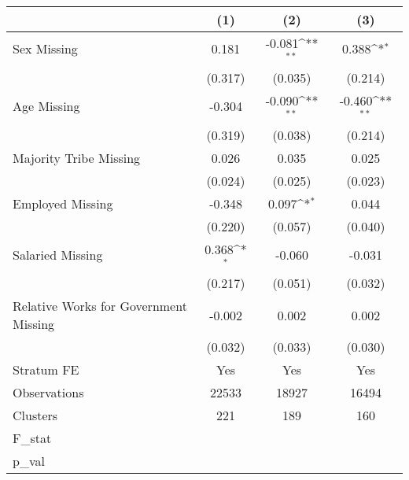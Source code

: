 {
\def\sym#1{\ifmmode^{#1}\else\(^{#1}\)\fi}
\begin{tabular}{l*{3}{c}}
\hline\hline
                &\multicolumn{1}{c}{(1)}         &\multicolumn{1}{c}{(2)}         &\multicolumn{1}{c}{(3)}         \\
\hline
Sex Missing     &    0.181         &   -0.081\sym{**} &    0.388\sym{*}  \\
                &  (0.317)         &  (0.035)         &  (0.214)         \\
Age Missing     &   -0.304         &   -0.090\sym{**} &   -0.460\sym{**} \\
                &  (0.319)         &  (0.038)         &  (0.214)         \\
Majority Tribe Missing&    0.026         &    0.035         &    0.025         \\
                &  (0.024)         &  (0.025)         &  (0.023)         \\
Employed Missing&   -0.348         &    0.097\sym{*}  &    0.044         \\
                &  (0.220)         &  (0.057)         &  (0.040)         \\
Salaried Missing&    0.368\sym{*}  &   -0.060         &   -0.031         \\
                &  (0.217)         &  (0.051)         &  (0.032)         \\
Relative Works for Government Missing&   -0.002         &    0.002         &    0.002         \\
                &  (0.032)         &  (0.033)         &  (0.030)         \\
Stratum FE      &      Yes         &      Yes         &      Yes         \\
\hline
Observations    &    22533         &    18927         &    16494         \\
Clusters        &      221         &      189         &      160         \\
F\_stat          &                  &                  &                  \\
p\_val           &                  &                  &                  \\
\hline\hline
\end{tabular}
}
